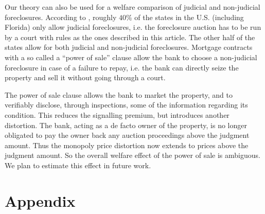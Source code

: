 \documentclass[11pt,twopage]{article}
\begin{document}
Our theory can also be used for a welfare comparison of judicial and
non-judicial foreclosures.
According to \cite{nelson2004reforming}, roughly $40\%$ of the states
in the U.S. (including Florida) only allow judicial foreclosures,
i.e. the foreclosure auction has to be run by a court with rules as
the ones described in this article. The other half of the states allow
for both judicial and non-judicial foreclosures.  Mortgage contracts
with a so called a ``power of sale'' clause allow the bank to choose a
non-judicial foreclosure in case of a failure to repay, i.e. the bank
can directly seize the property and sell it without going through a
court.

The power of sale clause allows the bank to market the property, and
to verifiably disclose, through inspections, some of the information
regarding its condition. This reduces the signalling premium, but
introduces another distortion. The bank, acting as a de facto owner of
the property, is no longer obligated to pay the owner back any auction
proceedings above the judgment amount. Thus the monopoly price
distortion now extends to prices above the judgment amount. So the
overall welfare effect of the power of sale is ambiguous. We plan to
estimate this effect in future work.


%  
% 

\appendix
\section*{Appendix}
\end{document}

